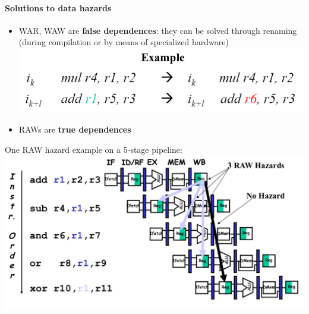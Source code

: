 \paragraph{Solutions to data hazards}
\begin{itemize}
    \item WAR, WAW are \textbf{false dependences}: 
    they can be solved through renaming (during compilation or by means of specialized hardware)\\
    \includegraphics[width=\textwidth]{images/renaming_solution_data_hazard.png}
    
    \item RAWs are \textbf{true dependences}
\end{itemize}

One RAW hazard example on a 5-stage pipeline:\\
\includegraphics[width=\textwidth]{images/RAW_hazard_example.png}

